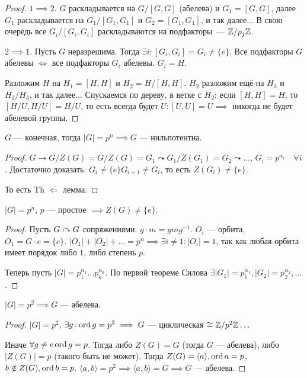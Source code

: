 \begin{proof}
    $1 \implies 2$. $G$ раскладывается на $G / [G, G]$ (абелева) и $G_1 = [G, G]$, далее $G_1$ раскладывается на $G_1 / [G_1, G_1]$ и $G_2 = [G_1, G_1]$, и так далее... В свою очередь все $G_i / [G_i, G_i]$ раскладываются на подфакторы~--- $\mathbb{Z} / p_j \mathbb{Z}$.

    $2 \implies 1$. Пусть $G$ неразрешима. Тогда  $\exists i\!: [G_i, G_i] = G_i \neq \{e\}$. Все подфакторы  $G$ абелевы  $\iff$ все подфакторы  $G_i$ абелевы.  $G_i = H$.

    Разложим  $H$ на $H_1 = [H, H]$ и $H_2 = H / [H, H]$. $H_2$ разложим ещё на $H_3$ и $H_2 / H_3$, и так далее... Спускаемся по дереву, в ветке с $H_2$: если $[H, H] = H$, то $[H / U, H / U] = H / U$, то есть всегда будет $U: [U, U] = U \implies$ никогда не будет абелевой группы. 
\end{proof}
\begin{theorem}
    $G$ --- конечная, тогда  $|G| = p^n \implies G$ --- нильпотентна. 
\end{theorem}
\begin{proof}
    $G \to G / Z(G) = G / Z(G) = G_1 \leadsto G_1 / Z(G_1) = G_2 \leadsto \ldots$, $G_i = p^{\alpha_i} \quad \forall i$. Достаточно доказать:  $G_i \neq \{e\} G_{i+1} \neq G_i$, то есть  $Z(G_i) \neq \{e\}$. 

    То есть  Th  $\Leftarrow$  лемма.
\end{proof}
\begin{lemma}
    $|G| = p^n$,  $p$ --- простое  $\implies Z(G) \neq \{e\}$.
\end{lemma}
\begin{proof}
    Пусть $G \curvearrowright G$ сопряжениями. $g \cdot m = g m g^{-1}$.   $O_i$ --- орбита,  $O_1 = G \cdot e = \{e\}$.  $|O_1| + |O_2| + \ldots = p^n \implies \exists i \neq 1\!: |O_i| = 1$, так как любая орбита имеет порядок либо $1$, либо степень $p$. 

    Теперь пусть $|G| = p_1^{\alpha_1} \ldots p_k^{\alpha_k}$. По первой теореме Силова $\exists |G_1| = p_1^{\alpha_1}, |G_2| = p_2^{\alpha_2}, \ldots$.
\end{proof}
\begin{theorem}
    $|G| = p^2 \implies G$ --- абелева.
\end{theorem}
\begin{proof}
    $|G| = p^2$,  $\exists g\!: \operatorname{ord} g =p^2 \implies G$ --- циклическая  $\cong \mathbb{Z} / p^2 \mathbb{Z} \ldots$

    Иначе $\forall g \neq e \operatorname{ord} g = p$.  Тогда либо $Z(G) = G$ (тогда $G$ --- абелева), либо $|Z(G)| = p$ (такого быть не может). Тогда  $Z(G) = \langle a \rangle, \operatorname{ord} a = p$,  $b \notin Z(G), \operatorname{ord} b = p$.  $\langle a, b\rangle = p^2 \implies \langle a, b \rangle = G \implies G$ --- абелева.
\end{proof}
